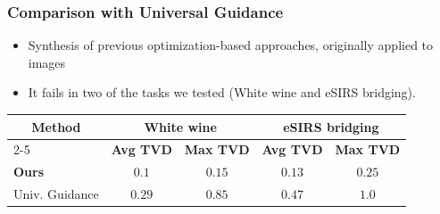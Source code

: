 
\begin{frame} %
\frametitle{Comparison with Universal Guidance \citep{bansal2023universal}}


        \begin{itemize}            
        \item Synthesis of previous optimization-based approaches, originally applied to images


        \item It fails in two of the tasks we tested (White wine and eSIRS bridging).
            
        \end{itemize}

        \begin{table}[ht]
\centering
\begin{tabular}{@{}lcccc@{}}
\toprule
\multicolumn{1}{c}{\multirow{2}{*}{Method}} & \multicolumn{2}{c}{White wine} & \multicolumn{2}{c}{eSIRS bridging} \\ \cmidrule(l){2-5} 
\multicolumn{1}{c}{} & \textbf{Avg TVD} & \textbf{Max TVD} & \textbf{Avg TVD} & \textbf{Max TVD} \\ \midrule
\textbf{Ours}        & $\mathbf{0.1}$    & $\mathbf{0.15}$  & $\mathbf{0.13}$  & $\mathbf{0.25}$  \\
Univ. Guidance                   & $0.29$           & $0.85$           & $0.47$           & $1.0$             \\ \bottomrule
\end{tabular}
\end{table}


\end{frame} %



